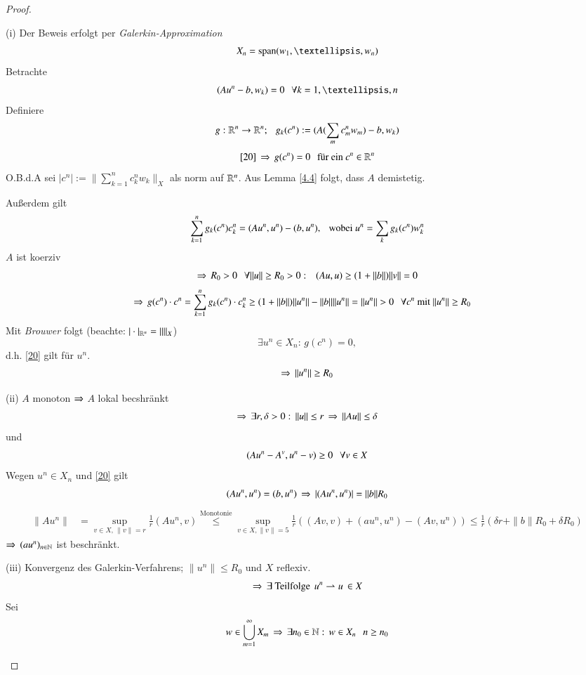 \begin{proof}
    \begin{description}
    \item{(i)}
    Der Beweis erfolgt per \textit{Galerkin-Approximation}
    \[
        X_n=\mr{span}(w_1,…,w_n)
    \]
    Betrachte
    \begin{equation}\label{20}
        (Au^n-b,w_k)=0 \qq \forall k=1,…,n
    \end{equation}
    Definiere
    \[
        g:\mathbb{R}^n\rightarrow \mathbb{R}^n; \hspace{.25cm} g_k(c^n):= (A(\sum_mc_m^nw_m)-b,w_k)
    \]
    \[
        \ref{20} \, \Rightarrow \, g(c^n)=0 \hspace{.25cm} \text{für ein } c^n\in\mathbb{R}^n  
    \]
    O.B.d.A sei $|c^n|:= \|\sum_{k=1}^n c^n_kw_k\|_X$ als norm auf $\mathbb{R}^n$. Aus Lemma \ref{4.4} folgt,
    dass $A$ demistetig. 

    Außerdem gilt
    \[
        \sum_{k=1}^n g_k(c^n)c^n_k=(Au^n,u^n)-(b,u^n), \hspace{.25cm} \text{wobei } u^n=\sum_kg_k(c^n)w_k^n
    \]
    $A$ ist koerziv
    \[
        \Rightarrow \, R_0>0 \hspace{.25cm} \forall \|u\|\geq R_0>0: \hspace{.25cm} (Au,u)\geq (1+\|b\|)\|v\| =0
    \]
    \begin{align*}
        \Ra \, g(c^n)\cdot c^n &= \sum_{k=1}^ng_k(c^n)\cdot c_k^n \geq (1+\|b\|)\|u^n\| - \|b\|\|u^n\|
        =\|u^n\|>0 \qq \forall c^n \text{ mit } \|u^n\|\geq R_0
    \end{align*}
    Mit \textit{Brouwer} folgt (beachte: $|\cdot|_{\mathbb{R}^n}=\|\|_X$)
    \[
        \exists u^n\in X_n: \, g(c^n)=0,
    \]
    d.h. \ref{20} gilt für $u^n$.
    \[
        \Rightarrow \, \|u^n\|\geq R_0
    \]
    \item{(ii)}
    $A$ monoton $\Rightarrow$ $A$ lokal becshränkt
    \[
        \Rightarrow \, \exists r,\delta>0: \, \|u\|\leq r \, \Rightarrow \, \|Au\|\leq \delta
    \]
    und
    \[
        (Au^n-A^v,u^n-v)\geq 0 \hspace{.25cm} \forall v\in X
    \]
    Wegen $u^n\in X_n$ und \ref{20} gilt
    \[
        (Au^n,u^n)=(b,u^n)\, \Rightarrow \, |(Au^n,u^n)|=\|b\|R_0
    \]
    \begin{align*}
        \|Au^n\|&= \sup_{v\in X, \, \|v\|=r} \frac1r(Au^n,v) \overset{\text{Monotonie}}{\leq} 
        \sup_{v\in X, \|v\|=5} \frac1r ((Av,v)+(au^n,u^n)-(Av,u^n)) \leq \frac1r (\delta r+ \|b\|R_0
                +\delta R_0)
    \end{align*}
    $\Rightarrow $ $(au^n)_{n\in \mathbb{N}}$ ist beschränkt.
    \item{(iii)}
    Konvergenz des Galerkin-Verfahrens; $\|u^n\|\leq R_0$ und $X$ reflexiv.
    \[
        \Rightarrow \, \exists \text{ Teilfolge } \, u^n\rightharpoonup u \,\in X
    \]
    Sei 
    \[
        w\in \bigcup_{m=1}^\infty X_m \, \Rightarrow \, \exists n_0\in\mathbb{N}: \, w\in X_n\hspace{.25cm} n\geq n_0
\]
\end{description}
\end{proof}
